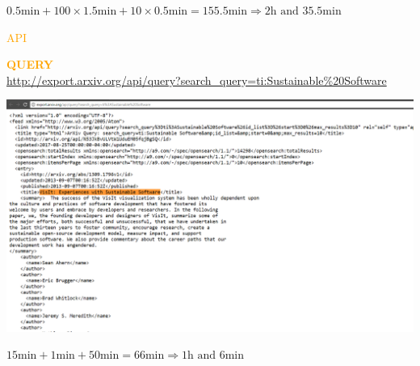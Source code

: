 \documentclass{beamer}
\begin{document}
\begin{frame}
\begin{center}
\color{orange}\Large{$0.5 \textrm{min} + \textrm{100} \times 1.5 \textrm{min} + 10 \times 0.5
\textrm{min}= 155.5 \textrm{min} \Rightarrow 2 \textrm{h} \textrm{ and } 35.5
\textrm{min}$}
\end{center}
\end{frame}

\begin{frame}
\begin{center}
\textcolor{orange}{
\Huge{API}}
\end{center}
\end{frame}

\begin{frame}[fragile]
    \centering
    \textcolor{orange}{\textbf{QUERY}} \\
    \vspace{3mm}
    \small{\url{http://export.arxiv.org/api/query?search_query=ti:Sustainable%20Software}} \\
\end{frame}

\begin{frame}
\begin{center}
    \includegraphics[width=\textwidth]{static/arxiv_api_result.png}
\end{center}
\end{frame}

\begin{frame}
\begin{center}
\color{orange}\Large{$15 \textrm{min} + 1 \textrm{min} + 50 \textrm{min} =
66 \textrm{min} \Rightarrow 1\textrm{h} \textrm{ and } 6 \text{min}$}
\end{center}
\end{frame}
\end{document}
